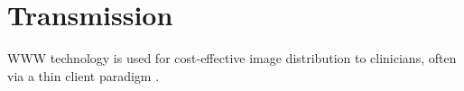 \part{Transmission}

WWW technology is used for cost-effective image distribution to clinicians, often via a thin client paradigm \cite{bushberg2011essential}.

